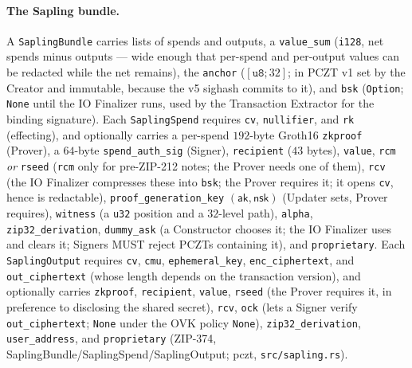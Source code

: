 \documentclass[11pt,a4paper]{article}
\theoremstyle{definition}
\newcommand{\aksym}{\ensuremath{\mathsf{ak}}}
\begin{document}
\paragraph{The Sapling bundle.} A \texttt{SaplingBundle} carries lists of
spends and outputs, a \texttt{value\_sum} (\texttt{i128}, net spends minus
outputs --- wide enough that per-spend and per-output values can be
redacted while the net remains), the \texttt{anchor} ($[\mathtt{u8};32]$;
in PCZT v1 set by the Creator and immutable, because the v5 sighash
commits to it), and \texttt{bsk} (\texttt{Option}; \texttt{None} until the
IO Finalizer runs, used by the Transaction Extractor for the binding
signature). Each \texttt{SaplingSpend} requires \texttt{cv},
\texttt{nullifier}, and \texttt{rk} (effecting), and optionally carries a
per-spend $192$-byte Groth16 \texttt{zkproof} (Prover), a $64$-byte
\texttt{spend\_auth\_sig} (Signer), \texttt{recipient} ($43$ bytes),
\texttt{value}, \texttt{rcm} \emph{or} \texttt{rseed} (\texttt{rcm} only
for pre-ZIP-212 notes; the Prover needs one of them), \texttt{rcv} (the
IO Finalizer compresses these into \texttt{bsk}; the Prover requires it;
it opens \texttt{cv}, hence is redactable),
\texttt{proof\_generation\_key} $(\aksym, \mathsf{nsk})$ (Updater sets,
Prover requires), \texttt{witness} (a \texttt{u32} position and a
$32$-level path), \texttt{alpha}, \texttt{zip32\_derivation},
\texttt{dummy\_ask} (a Constructor chooses it; the IO Finalizer uses and
clears it; Signers MUST reject PCZTs containing it), and
\texttt{proprietary}. Each \texttt{SaplingOutput} requires \texttt{cv},
\texttt{cmu}, \texttt{ephemeral\_key}, \texttt{enc\_ciphertext}, and
\texttt{out\_ciphertext} (whose length depends on the transaction
version), and optionally carries \texttt{zkproof}, \texttt{recipient},
\texttt{value}, \texttt{rseed} (the Prover requires it, in preference to
disclosing the shared secret), \texttt{rcv}, \texttt{ock} (lets a Signer
verify \texttt{out\_ciphertext}; \texttt{None} under the OVK policy
\texttt{None}), \texttt{zip32\_derivation}, \texttt{user\_address}, and
\texttt{proprietary} (ZIP-374, SaplingBundle/SaplingSpend/SaplingOutput;
\textsf{pczt}, \texttt{src/sapling.rs}).
\end{document}
